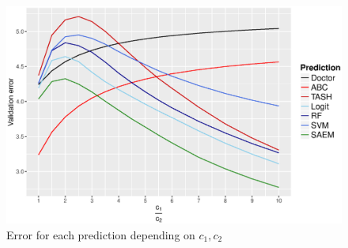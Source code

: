 \begin{figure}[h]
	\centering
   \includegraphics[scale=0.6]{Resources/final_pred}
   \caption{Error for each prediction depending on $c_1, c_2$}
   \label{fig.final_pred}
\end{figure}